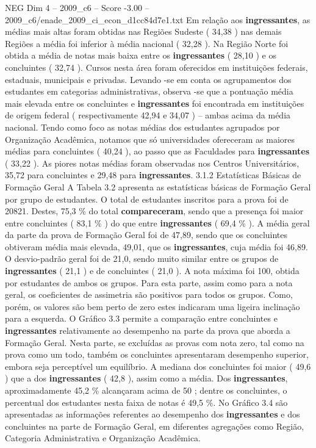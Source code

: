 \begin{textsample}{NEG Dim 4 – 2009\_c6 – Score -3.00 – 2009\_c6/enade\_2009\_ci\_econ\_d1cc84d7e1.txt}
Em relação aos \textbf{ingressantes}, as médias mais altas foram obtidas nas Regiões Sudeste ( 34,38 ) nas demais Regiões a média foi inferior à média nacional ( 32,28 ).
Na Região Norte foi obtida a média de notas mais baixa entre os \textbf{ingressantes} ( 28,10 ) e os concluintes ( 32,74 ).
Cursos nesta área foram oferecidos em instituições federais, estaduais, municipais e privadas.
Levando -se em conta os agrupamentos dos estudantes em categorias administrativas, observa -se que a pontuação média mais elevada entre os concluintes e \textbf{ingressantes} foi encontrada em instituições de origem federal ( respectivamente 42,94 e 34,07 ) – ambas acima da média nacional.
Tendo como foco as notas médias dos estudantes agrupados por Organização Acadêmica, notamos que só universidades ofereceram as maiores médias para concluintes ( 40,24 ), ao passo que as Faculdades para \textbf{ingressantes} ( 33,22 ).
As piores notas médias foram observadas nos Centros Universitários, 35,72 para concluintes e 29,48 para \textbf{ingressantes}. 3.1.2 Estatísticas Básicas de Formação Geral A Tabela 3.2 apresenta as estatísticas básicas de Formação Geral por grupo de estudantes.
O total de estudantes inscritos para a prova foi de 20821.
Destes, 75,3 \% do total \textbf{compareceram}, sendo que a presença foi maior entre concluintes ( 83,1 \% ) do que entre \textbf{ingressantes} ( 69,4 \% ).
A média geral da parte da prova de Formação Geral foi de 47,89, sendo que os concluintes obtiveram média mais elevada, 49,01, que os \textbf{ingressantes}, cuja média foi 46,89.
O desvio-padrão geral foi de 21,0, sendo muito similar entre os grupos de \textbf{ingressantes} ( 21,1 ) e de concluintes ( 21,0 ).
A nota máxima foi 100, obtida por estudantes de ambos os grupos.
Para esta parte, assim como para a nota geral, os coeficientes de assimetria são positivos para todos os grupos.
Como, porém, os valores são bem perto de zero estes indicaram uma ligeira inclinação para a esquerda.
O Gráfico 3.3 permite a comparação entre concluintes e \textbf{ingressantes} relativamente ao desempenho na parte da prova que aborda a Formação Geral.
Nesta parte, se excluídas as provas com nota zero, tal como na prova como um todo, também os concluintes apresentaram desempenho superior, embora seja perceptível um equilíbrio.
A mediana dos concluintes foi maior ( 49,6 ) que a dos \textbf{ingressantes} ( 42,8 ), assim como a média.
Dos \textbf{ingressantes}, aproximadamente 45,2 \% alcançaram acima de 50 ; dentre os concluintes, o percentual dos estudantes nesta faixa de notas é 49,5 \%.
No Gráfico 3.4 são apresentadas as informações referentes ao desempenho dos \textbf{ingressantes} e dos concluintes na parte de Formação Geral, em diferentes agregações como Região, Categoria Administrativa e Organização Acadêmica.

\end{textsample}

